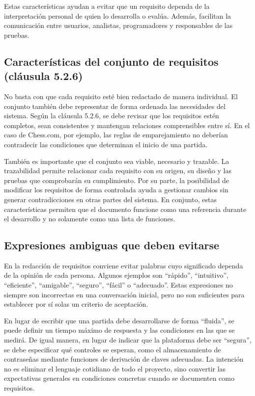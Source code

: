 \documentclass[12pt,a4paper]{article}
\begin{document}
Estas características ayudan a evitar que un requisito dependa de la interpretación personal de quien lo desarrolla o evalúa. Además, facilitan la comunicación entre usuarios, analistas, programadores y responsables de las pruebas.

\subsection{Características del conjunto de requisitos (cláusula 5.2.6)}

No basta con que cada requisito esté bien redactado de manera individual. El conjunto también debe representar de forma ordenada las necesidades del sistema. Según la cláusula 5.2.6, se debe revisar que los requisitos estén completos, sean consistentes y mantengan relaciones comprensibles entre sí. En el caso de Chess.com, por ejemplo, las reglas de emparejamiento no deberían contradecir las condiciones que determinan el inicio de una partida.

También es importante que el conjunto sea viable, necesario y trazable. La trazabilidad permite relacionar cada requisito con su origen, su diseño y las pruebas que comprobarán su cumplimiento. Por su parte, la posibilidad de modificar los requisitos de forma controlada ayuda a gestionar cambios sin generar contradicciones en otras partes del sistema. En conjunto, estas características permiten que el documento funcione como una referencia durante el desarrollo y no solamente como una lista de funciones.

\subsection{Expresiones ambiguas que deben evitarse}

En la redacción de requisitos conviene evitar palabras cuyo significado dependa de la opinión de cada persona. Algunos ejemplos son ``rápido'', ``intuitivo'', ``eficiente'', ``amigable'', ``seguro'', ``fácil'' o ``adecuado''. Estas expresiones no siempre son incorrectas en una conversación inicial, pero no son suficientes para establecer por sí solas un criterio de aceptación.

En lugar de escribir que una partida debe desarrollarse de forma ``fluida'', se puede definir un tiempo máximo de respuesta y las condiciones en las que se medirá. De igual manera, en lugar de indicar que la plataforma debe ser ``segura'', se debe especificar qué controles se esperan, como el almacenamiento de contraseñas mediante funciones de derivación de claves adecuadas. La intención no es eliminar el lenguaje cotidiano de todo el proyecto, sino convertir las expectativas generales en condiciones concretas cuando se documenten como requisitos.
\end{document}
